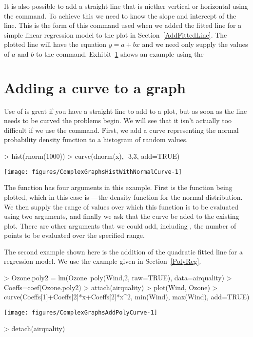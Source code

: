 It is also possible to add a straight line that is niether vertical or horizontal using the  command. To achieve this we need to know the slope and intercept of the line. This is the form of this command used when we added the fitted line for a simple linear regression model to the plot in Section~\ref{AddFittedLine}. The plotted line will have the equation $y=a+bx$ and we need only supply the values of $a$ and $b$ to the  command. Exhibit~\ref{} shows an example using the 

\section{Adding a curve to a graph}

Use of  is great if you have a straight line to add to a plot, but as soon as the line needs to be curved the problems begin. We will see that it isn't actually too difficult if we use the  command. First, we add a curve representing the normal probability density function to a histogram of random values.
\begin{Schunk}
\begin{Sinput}
> hist(rnorm(1000))
> curve(dnorm(x), -3,3, add=TRUE)
\end{Sinput}

\texttt{[image: figures/ComplexGraphsHistWithNormalCurve-1]} \end{Schunk}

The  function has four arguments in this example. First is the function being plotted, which in this case is  ---the density function for the normal distribution. We then supply the range of values over which this function is to be evaluated using two arguments, and finally we ask that the curve be aded to the existing plot. There are other arguments that we could add, including , the number of points to be evaluated over the specified range.

The second example shown here is the addition of the quadratic fitted line for a regression model. We use the example given in Section~\ref{PolyReg}.
\begin{Schunk}
\begin{Sinput}
> Ozone.poly2 = lm(Ozone~poly(Wind,2, raw=TRUE), data=airquality)
> Coeffs=coef(Ozone.poly2)
> attach(airquality)
> plot(Wind, Ozone)
> curve(Coeffs[1]+Coeffs[2]*x+Coeffs[2]*x^2, min(Wind), max(Wind), add=TRUE)
\end{Sinput}

\texttt{[image: figures/ComplexGraphsAddPolyCurve-1]} \begin{Sinput}
> detach(airquality)
\end{Sinput}
\end{Schunk}

